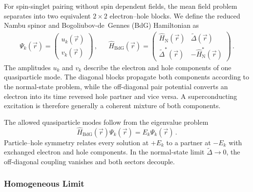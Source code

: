             For spin-singlet pairing without spin dependent fields, the mean field problem separates into two equivalent $2\times2$ electron--hole blocks. We define the reduced Nambu spinor and Bogoliubov-de~Gennes (BdG) Hamiltonian as
            \begin{align}
                \Psi_k(\vec r)
                =
                \begin{pmatrix}
                    u_k(\vec r)\\
                    v_k(\vec r)
                \end{pmatrix}\,,
                &&
                \hat H_\mathrm{BdG}(\vec r)
                =
                \begin{pmatrix}
                    \hat H_\mathrm{N}(\vec r) & \widetilde{\Delta}(\vec r)\\
                    \widetilde{\Delta}^{\ast}(\vec r) & -\hat H_\mathrm{N}^\ast(\vec r)
                \end{pmatrix}\,.
                \label{eq:micro:bdg-definitions}
            \end{align}
            The amplitudes $u_k$ and $v_k$ describe the electron and hole components of one quasiparticle mode. The diagonal blocks propagate both components according to the normal-state problem, while the off-diagonal pair potential converts an electron into its time reversed hole partner and vice versa. A superconducting excitation is therefore generally a coherent mixture of both components.

            The allowed quasiparticle modes follow from the eigenvalue problem
            \begin{equation}
                \hat H_\mathrm{BdG}(\vec r)\Psi_k(\vec r)
                =E_k\Psi_k(\vec r)\,.
                \label{eq:micro:bdg}
            \end{equation}
            Particle--hole symmetry relates every solution at $+E_k$ to a partner at $-E_k$ with exchanged electron and hole components. In the normal-state limit $\widetilde{\Delta}\to0$, the off-diagonal coupling vanishes and both sectors decouple. \cite{bogoljubov_new_1958,nambu_quasi-particles_1960,de_gennes_superconductivity_1966}

        \subsubsection*{Homogeneous Limit}
        \label{subsubsec:micro:homogeneous-limit}

